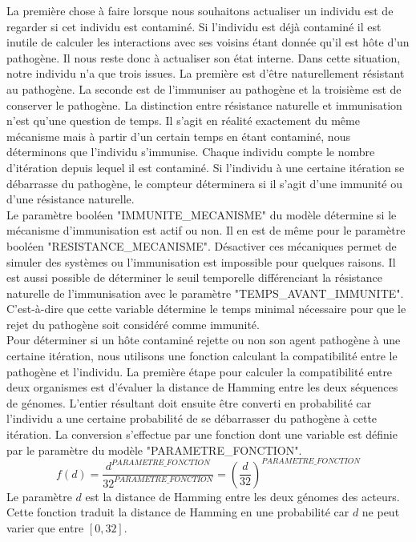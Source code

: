 La première chose à faire lorsque nous souhaitons actualiser un individu est de regarder si cet individu est contaminé. Si l'individu est déjà contaminé il est inutile de calculer les interactions avec ses voisins étant donnée qu'il est hôte d'un pathogène. Il nous reste donc à actualiser son état interne. Dans cette situation, notre individu n'a que trois issues. La première est d'être naturellement résistant au pathogène. La seconde est de l'immuniser au pathogène et la troisième est de conserver le pathogène. La distinction entre résistance naturelle et immunisation n'est qu'une question de temps. Il s'agit en réalité exactement du même mécanisme mais à partir d'un certain temps en étant contaminé, nous déterminons que l'individu s'immunise. Chaque individu compte le nombre d'itération depuis lequel il est contaminé. Si l'individu à une certaine itération se débarrasse du pathogène, le compteur déterminera si il s'agit d'une immunité ou d'une résistance naturelle.\\

Le paramètre booléen "IMMUNITE\_MECANISME" du modèle détermine si le mécanisme d'immunisation est actif ou non. Il en est de même pour le paramètre booléen "RESISTANCE\_MECANISME". Désactiver ces mécaniques permet de simuler des systèmes ou l'immunisation est impossible pour quelques raisons. Il est aussi possible de déterminer le seuil temporelle différenciant la résistance naturelle de l'immunisation avec le paramètre "TEMPS\_AVANT\_IMMUNITE". C'est-à-dire que cette variable détermine le temps minimal nécessaire pour que le rejet du pathogène soit considéré comme immunité.\\

Pour déterminer si un hôte contaminé rejette ou non son agent pathogène à une certaine itération, nous utilisons une fonction calculant la compatibilité entre le pathogène et l'individu. La première étape pour calculer la compatibilité entre deux organismes est d'évaluer la distance de Hamming entre les deux séquences de génomes. L'entier résultant doit ensuite être converti en probabilité car l'individu a une certaine probabilité de se débarrasser du pathogène à cette itération. La conversion s'effectue par une fonction dont une variable est définie par le paramètre du modèle "PARAMETRE\_FONCTION".\\
$$
f(d) = \frac{d^{PARAMETRE\_FONCTION}}{32^{PARAMETRE\_FONCTION}} = (\frac{d}{32})^{PARAMETRE\_FONCTION}
$$
Le paramètre $d$ est la distance de Hamming entre les deux génomes des acteurs. Cette fonction traduit la distance de Hamming en une probabilité car $d$ ne peut varier que entre $[0,32]$.

